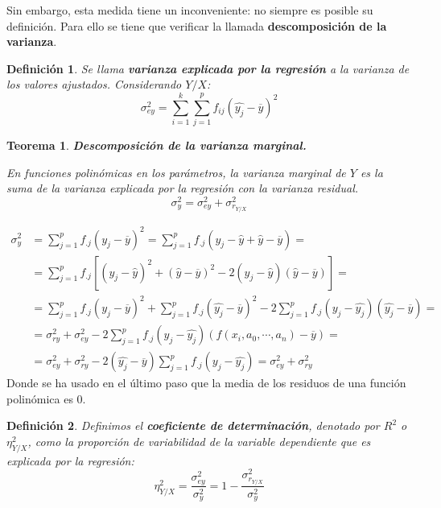 \documentclass[10pt, a4paper]{article}
\makeatletter
\renewenvironment{proof}[1][\proofname] {\par\pushQED{\qed}\normalfont\topsep6\p@\@plus6\p@\relax\trivlist\item[\hskip\labelsep\itshape\sffamily#1\@addpunct{.}]\ignorespaces}{\popQED\endtrivlist\@endpefalse}
\theoremstyle{theorem-style}
\newtheorem{nth}{Teorema}[section]
\theoremstyle{definition-style}
\newtheorem{ndef}{Definición}[section]
\theoremstyle{remark-style}
\theoremstyle{example-style}
\theoremstyle{definition-style}
\theoremstyle{remark-style}
\makeatother
\begin{document}
	Sin embargo, esta medida tiene un inconveniente: no siempre es posible su
	definición. Para ello se tiene que verificar la llamada \textbf{descomposición de la
	varianza}. \\

	\begin{ndef}
		Se llama \textbf{varianza explicada por la regresión} a la varianza de los
		valores ajustados. Considerando $Y/X$:
		$$
		\sigma_{ey}^2 = \sum_{i=1}^k\sum_{j=1}^p f_{ij}(\hat{y_j}-\overline{y})^2
		$$
	\end{ndef}

	\begin{nth}
	\textbf{Descomposición de la varianza marginal.}
	
	En funciones polinómicas en los parámetros, la varianza marginal de $Y$ es la suma
	de la varianza explicada por la regresión con la varianza residual.
	$$\sigma_y^2 = \sigma_{ey}^2 +\sigma_{r_{Y/X}}^2 $$
	\end{nth}
	\begin{proof}
	\begin{align*}
		\sigma_y^2 &= \sum_{j=1}^p f_{.j} (y_j - \overline{y})^2 =
		\sum_{j=1}^p f_{.j} (y_j - \hat{y} + \hat{y} - \overline{y}) = \\
		&= \sum_{j=1}^p f_{.j}\left[ (y_j - \hat{y})^2 +
		(\hat{y} - \overline{y})^2 - 2(y_j - \hat{y})(\hat{y}-\overline{y})\right] = \\
		&= \sum_{j=1}^p f_{.j} (y_j - \overline{y})^2
		+ \sum_{j=1}^p f_{.j} (\hat{y_j} - \overline{y})^2
		-2 \sum_{j=1}^p f_{.j} (y_j - \hat{y_j})(\hat{y_j} - \overline{y}) = \\
		&= \sigma_{ry}^2 + \sigma_{ey}^2
							- 2\sum_{j=1}^p f_{.j}
											(y_j - \hat{y_j})
											(f(x_i, a_ 0, \cdots, a_n) - \overline{y}) = \\
		&= \sigma_{ey}^2 + \sigma_{ry}^2
							- 2(\hat{y_j} - \overline{y})
								\sum_{j=1}^p f_{.j}(y_j - \hat{y_j}) = \sigma_{ey}^2 + \sigma_{ry}^2
	\end{align*}
Donde se ha usado en el último paso que la media de los residuos de una
	función polinómica es 0.
	\end{proof}

\begin{ndef}
	Definimos el \textbf{coeficiente de determinación}, denotado por $R^2$ o
	$\eta_{Y/X}^2$, como la proporción de variabilidad de la variable dependiente
	que es explicada por la regresión:
	$$
	\eta_{Y/X}^2 =\frac{\sigma_{ey}^2}{\sigma_y^2}  = 1 -\frac{\sigma_{r_{Y/X}}^2}{\sigma_y^2}
	$$
\end{ndef}
\end{document}

